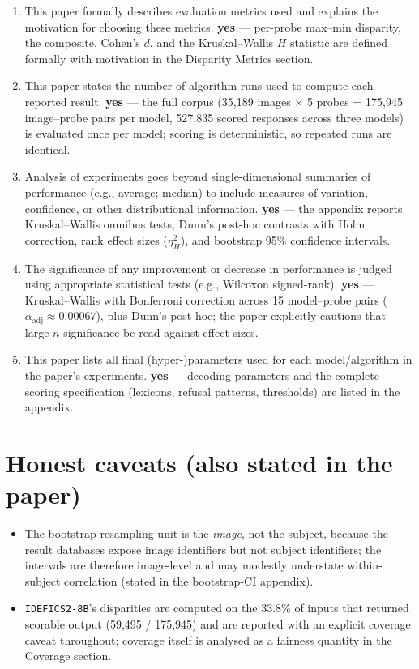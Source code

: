 \documentclass[letterpaper]{article}
\begin{document}
\begin{enumerate}[leftmargin=*]
\item This paper formally describes evaluation metrics used and explains the motivation for choosing these metrics. \textbf{yes} --- per-probe max--min disparity, the composite, Cohen's $d$, and the Kruskal--Wallis $H$ statistic are defined formally with motivation in the Disparity Metrics section.
\item This paper states the number of algorithm runs used to compute each reported result. \textbf{yes} --- the full corpus (35{,}189 images $\times$ 5 probes = 175{,}945 image--probe pairs per model, 527{,}835 scored responses across three models) is evaluated once per model; scoring is deterministic, so repeated runs are identical.
\item Analysis of experiments goes beyond single-dimensional summaries of performance (e.g., average; median) to include measures of variation, confidence, or other distributional information. \textbf{yes} --- the appendix reports Kruskal--Wallis omnibus tests, Dunn's post-hoc contrasts with Holm correction, rank effect sizes ($\eta^2_H$), and bootstrap 95\% confidence intervals.
\item The significance of any improvement or decrease in performance is judged using appropriate statistical tests (e.g., Wilcoxon signed-rank). \textbf{yes} --- Kruskal--Wallis with Bonferroni correction across 15 model--probe pairs ($\alpha_{\mathrm{adj}}\approx0.00067$), plus Dunn's post-hoc; the paper explicitly cautions that large-$n$ significance be read against effect sizes.
\item This paper lists all final (hyper-)parameters used for each model/algorithm in the paper's experiments. \textbf{yes} --- decoding parameters and the complete scoring specification (lexicons, refusal patterns, thresholds) are listed in the appendix.
\end{enumerate}

\section*{Honest caveats (also stated in the paper)}
\begin{itemize}[leftmargin=*]
\item The bootstrap resampling unit is the \emph{image}, not the subject, because
the result databases expose image identifiers but not subject identifiers; the
intervals are therefore image-level and may modestly understate within-subject
correlation (stated in the bootstrap-CI appendix).
\item \texttt{IDEFICS2-8B}'s disparities are computed on the 33.8\% of inputs that
returned scorable output (59{,}495 / 175{,}945) and are reported with an explicit
coverage caveat throughout; coverage itself is analysed as a fairness quantity in
the Coverage section.
\end{itemize}
\end{document}
